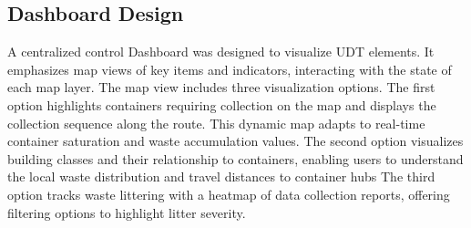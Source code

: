 \documentclass[authoryear,preprint,review,11pt,doubleblind]{elsarticle}
\begin{document}
    \subsection{Dashboard Design} \label{subsec:Dashboard}

    A centralized control Dashboard was designed to visualize UDT elements. It emphasizes map views of key items and indicators, interacting with the state of each map layer.  The map view includes three visualization options. The first option %
    highlights containers requiring collection on the map and displays the collection sequence along the route. This dynamic map adapts to real-time container saturation and waste accumulation values. The second option visualizes building classes and their relationship to containers, enabling users to understand the local waste distribution and travel distances to container hubs %
    The third option tracks waste littering with a heatmap of data collection reports, offering filtering options to highlight litter severity. %

    
\end{document}
